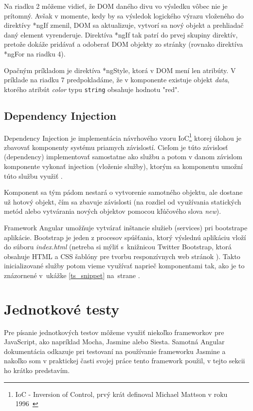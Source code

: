 \documentclass[
  printed, %
  twoside, %
  notable,   %
  nolof,   %
  nolot,   %
]{fithesis3}
\begin{document}
Na riadku 2 môžeme vidieť, že DOM daného divu vo výsledku vôbec nie je prítomný. Avšak v momente, kedy by sa výsledok logického výrazu vloženého do direktívy *ngIf zmenil, DOM sa aktualizuje, vytvorí sa nový objekt a prehliadač daný element vyrenderuje. Direktíva *ngIf tak patrí do prvej skupiny direktív, pretože dokáže pridávať a odoberať DOM objekty zo stránky (rovnako direktíva *ngFor na riadku 4).

Opačným príkladom je direktíva *ngStyle, ktorá v DOM mení len atribúty. V príklade na riadku 7 predpokladáme, že v komponente existuje objekt \textit{data}, ktorého atribút \textit{color} typu \texttt{string} obsahuje hodnotu "red".

\subsection{Dependency Injection}
\label{sec_di}
Dependency Injection je implementácia návrhového vzoru IoC\footnote{IoC - Inversion of Control, prvý krát definoval Michael Mattson v roku 1996~\cite{mattsson1996object}} ktorej úlohou je zbavovať komponenty systému priamych závislostí. Cieľom je túto závislosť (dependency) implementovať samostatne ako službu a potom v danom závislom komponente vykonať injection (vloženie služby), ktorým sa komponentu umožní túto službu využiť \cite{chiba2005aspect, yang2008empirical}.

Komponent sa tým pádom nestará o vytvorenie samotného objektu, ale dostane už hotový objekt, čím sa zbavuje závislosti (na rozdiel od využívania statických metód alebo vytvárania nových objektov pomocou kľúčového slova \textit{new}).

Framework Angular umožňuje vytvárať inštancie služieb (services) pri bootstrape aplikácie. Bootstrap je jeden z procesov spúšťania, ktorý výslednú aplikáciu vloží do súboru \textit{index.html} \cite{angular} (netreba si mýliť s~knižnicou Twitter Bootstrap, ktorá obsahuje HTML a CSS šablóny pre tvorbu responzívnych web stránok \cite{peska2017thesis}). Takto inicializované služby potom vieme využívať naprieč komponentami tak, ako je to znázornené v~ukážke \ref{ts_snippet} na~strane \pageref{ts_snippet}.

\section{Jednotkové testy}
Pre písanie jednotkových testov môžeme využiť niekoľko frameworkov pre JavaScript, ako napríklad Mocha, Jasmine alebo Siesta. Samotná Angular dokumentácia \cite{angular} odkazuje pri testovaní na používanie frameworku Jasmine a nakoľko som v praktickej časti svojej práce tento framework použil, v tejto sekcii ho krátko predstavím.
\end{document}
